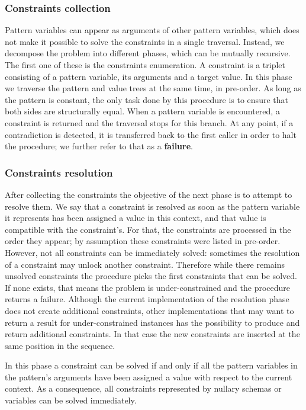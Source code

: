 \subsubsection{Constraints collection}

Pattern variables can appear as arguments of other pattern variables, which does not make it possible to solve the constraints in a single traversal. Instead, we decompose the problem into different phases, which can be mutually recursive. The first one of these is the constraints enumeration. A constraint is a triplet consisting of a pattern variable, its arguments and a target value. In this phase we traverse the pattern and value trees at the same time, in pre-order. As long as the pattern is constant, the only task done by this procedure is to ensure that both sides are structurally equal. When a pattern variable is encountered, a constraint is returned and the traversal stops for this branch. At any point, if a contradiction is detected, it is transferred back to the first caller in order to halt the procedure; we further refer to that as a \textbf{failure}.

\subsubsection{Constraints resolution}

After collecting the constraints the objective of the next phase is to attempt to resolve them. We say that a constraint is resolved as soon as the pattern variable it represents has been assigned a value in this context, and that value is compatible with the constraint's. For that, the constraints are processed in the order they appear; by assumption these constraints were listed in pre-order. However, not all constraints can be immediately solved: sometimes the resolution of a constraint may unlock another constraint. Therefore while there remains unsolved constraints the procedure picks the first constraints that can be solved. If none exists, that means the problem is under-constrained and the procedure returns a failure. Although the current implementation of the resolution phase does not create additional constraints, other implementations that may want to return a result for under-constrained instances has the possibility to produce and return additional constraints. In that case the new constraints are inserted at the same position in the sequence.

In this phase a constraint can be solved if and only if all the pattern variables in the pattern's arguments have been assigned a value with respect to the current context. As a consequence, all constraints represented by nullary schemas or variables can be solved immediately.


